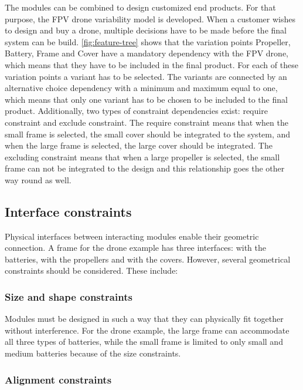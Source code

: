 \documentclass[sigconf,review]{acmart}
\begin{document}
The modules can be combined to design customized end products.  
For that purpose, the FPV drone variability model is developed. 
When a customer wishes to design and buy a drone, multiple decisions have to be made before the final system can be build. 
\cref{fig:feature-tree} shows that the variation points Propeller, Battery, Frame and Cover have a mandatory dependency with the FPV drone, which means that they have to be included in the final product. 
For each of these variation points a variant has to be selected. 
The variants are connected by an alternative choice dependency with a minimum and maximum equal to one, which means that only one variant has to be chosen to be included to the final product. 
Additionally, two types of constraint dependencies exist: require constraint and exclude constraint. 
The require constraint means that when the small frame is selected, the small cover should be integrated to the system, and when the large frame is selected, the large cover should be integrated. 
The excluding constraint means that when a large propeller is selected, the small frame can not be integrated to the design and this relationship goes the other way round as well.

\subsection{Interface constraints}

Physical interfaces between interacting modules enable their geometric connection. 
A frame for the drone example has three interfaces: with the batteries, with the propellers and with the covers. 
However, several geometrical constraints should be considered. These include:

\subsubsection*{Size and shape constraints}

Modules must be designed in such a way that they can physically fit together without interference. 
For the drone example, the large frame can accommodate all three types of batteries, while the small frame is limited to only small and medium batteries because of the size constraints.

\subsubsection*{Alignment constraints}
\end{document}

